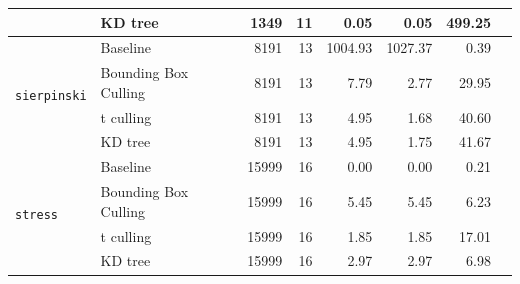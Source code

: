 \begin{table}[htbp]
\begin{tabular}{@{}llrrrrrr@{}}
     & KD tree & 1349 & 11 & 0.05 & 0.05 & 499.25 \\
    \midrule
    \multirow{4}{*}{\texttt{sierpinski}} & Baseline & 8191 & 13 & 1004.93 & 1027.37 & 0.39 \\
     & Bounding Box Culling & 8191 & 13 & 7.79 & 2.77 & 29.95 \\
     & t culling & 8191 & 13 & 4.95 & 1.68 & 40.60 \\
     & KD tree & 8191 & 13 & 4.95 & 1.75 & 41.67 \\
    \midrule
    \multirow{4}{*}{\texttt{stress}} & Baseline & 15999 & 16 & 0.00 & 0.00 & 0.21 \\
     & Bounding Box Culling & 15999 & 16 & 5.45 & 5.45 & 6.23 \\
     & t culling & 15999 & 16 & 1.85 & 1.85 & 17.01 \\
     & KD tree & 15999 & 16 & 2.97 & 2.97 & 6.98 \\
    \bottomrule
  \end{tabular}
\end{table}

